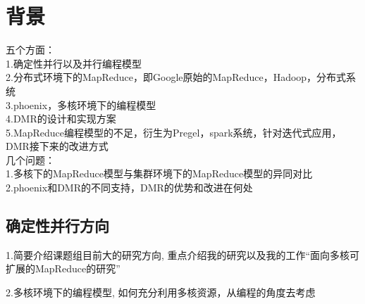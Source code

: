 \section{背景}
五个方面：\\
1.确定性并行以及并行编程模型\\
2.分布式环境下的MapReduce，即Google原始的MapReduce，Hadoop，分布式系统\\
3.phoenix，多核环境下的编程模型\\
4.DMR的设计和实现方案\\
5.MapReduce编程模型的不足，衍生为Pregel，spark系统，针对迭代式应用，DMR接下来的改进方式\\

几个问题：\\
1.多核下的MapReduce模型与集群环境下的MapReduce模型的异同对比\\
2.phoenix和DMR的不同支持，DMR的优势和改进在何处\\

\subsection{确定性并行方向}
1.简要介绍课题组目前大的研究方向, 重点介绍我的研究以及我的工作“面向多核可扩展的MapReduce的研究”

2.多核环境下的编程模型, 如何充分利用多核资源，从编程的角度去考虑





